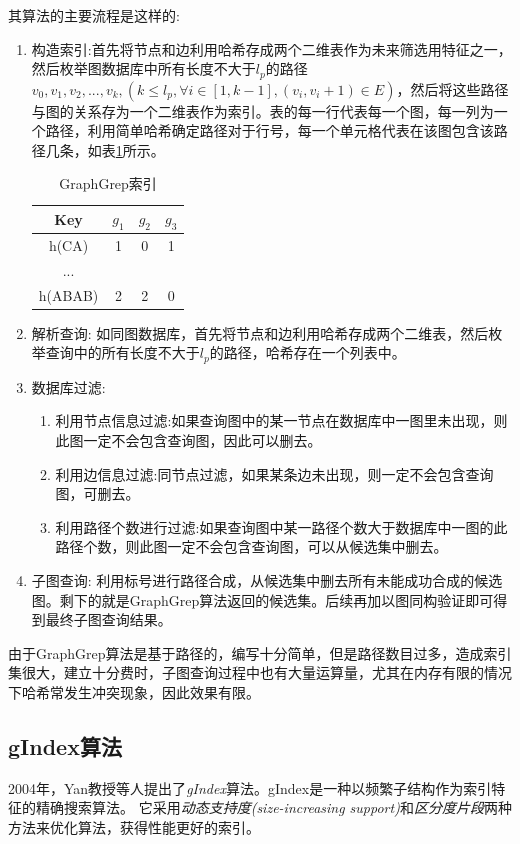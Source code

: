 \documentclass{XDBAthesis}
\begin{document}
其算法的主要流程是这样的:
\begin{enumerate}
    \item 构造索引:首先将节点和边利用哈希存成两个二维表作为未来筛选用特征之一，然后枚举图数据库中所有长度不大于$l_p $的路径$v_0 ,v_1 ,v_2 ,...,v_k ,( k\leq l_p ,\forall i\in [1,k-1],(v_i ,v_i+1)\in E) $，然后将这些路径与图的关系存为一个二维表作为索引。表的每一行代表每一个图，每一列为一个路径，利用简单哈希确定路径对于行号，每一个单元格代表在该图包含该路径几条，如表\ref{tb:grepIndex}所示。

\begin{table}[htb]
    \centering
    \begin{tabular}{|c|c|c|c|}
        \hline
        Key&$g_1 $&$g_2 $&$g_3 $ \\ \hline
        h(CA)&1&0&1 \\ \hline
        ...&&&\\ \hline
        h(ABAB)&2&2&0 \\
        \hline
    \end{tabular}
    \caption{GraphGrep索引}
    \label{tb:grepIndex}
\end{table}

    \item 解析查询: 如同图数据库，首先将节点和边利用哈希存成两个二维表，然后枚举查询中的所有长度不大于$l_p $的路径，哈希存在一个列表中。
    \item 数据库过滤: 
        \begin{enumerate}
            \item 利用节点信息过滤:如果查询图中的某一节点在数据库中一图里未出现，则此图一定不会包含查询图，因此可以删去。
            \item 利用边信息过滤:同节点过滤，如果某条边未出现，则一定不会包含查询图，可删去。
            \item 利用路径个数进行过滤:如果查询图中某一路径个数大于数据库中一图的此路径个数，则此图一定不会包含查询图，可以从候选集中删去。
        \end{enumerate}
    \item 子图查询: 利用标号进行路径合成，从候选集中删去所有未能成功合成的候选图。剩下的就是GraphGrep算法返回的候选集。后续再加以图同构验证即可得到最终子图查询结果。
\end{enumerate}
由于GraphGrep算法是基于路径的，编写十分简单，但是路径数目过多，造成索引集很大，建立十分费时，子图查询过程中也有大量运算量，尤其在内存有限的情况下哈希常发生冲突现象，因此效果有限。


\subsection{gIndex算法}
2004年，Yan教授等人提出了\emph{gIndex}算法\cite{gIndex}。gIndex是一种以频繁子结构作为索引特征的精确搜索算法。 它采用\emph{动态支持度(size-increasing support)}和\emph{区分度片段}两种方法来优化算法，获得性能更好的索引。
\end{document}
